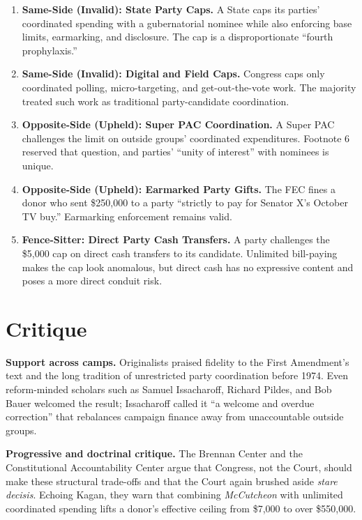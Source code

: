\documentclass[12pt]{article}
\begin{document}
\begin{enumerate}
\item \textbf{Same-Side (Invalid): State Party Caps.} A State caps its parties' coordinated spending with a gubernatorial nominee while also enforcing base limits, earmarking, and disclosure. The cap is a disproportionate ``fourth prophylaxis.''
\item \textbf{Same-Side (Invalid): Digital and Field Caps.} Congress caps only coordinated polling, micro-targeting, and get-out-the-vote work. The majority treated such work as traditional party-candidate coordination.
\item \textbf{Opposite-Side (Upheld): Super PAC Coordination.} A Super PAC challenges the limit on outside groups' coordinated expenditures. Footnote 6 reserved that question, and parties' ``unity of interest'' with nominees is unique.
\item \textbf{Opposite-Side (Upheld): Earmarked Party Gifts.} The FEC fines a donor who sent \$250,000 to a party ``strictly to pay for Senator X's October TV buy.'' Earmarking enforcement remains valid.
\item \textbf{Fence-Sitter: Direct Party Cash Transfers.} A party challenges the \$5,000 cap on direct cash transfers to its candidate. Unlimited bill-paying makes the cap look anomalous, but direct cash has no expressive content and poses a more direct conduit risk.
\end{enumerate}

\section{Critique}

\textbf{Support across camps.} Originalists praised fidelity to the First Amendment's text and the long tradition of unrestricted party coordination before 1974. Even reform-minded scholars such as Samuel Issacharoff, Richard Pildes, and Bob Bauer welcomed the result; Issacharoff called it ``a welcome and overdue correction'' that rebalances campaign finance away from unaccountable outside groups.

\textbf{Progressive and doctrinal critique.} The Brennan Center and the Constitutional Accountability Center argue that Congress, not the Court, should make these structural trade-offs and that the Court again brushed aside \textit{stare decisis}. Echoing Kagan, they warn that combining \textit{McCutcheon} with unlimited coordinated spending lifts a donor's effective ceiling from \$7,000 to over \$550,000.
\end{document}
